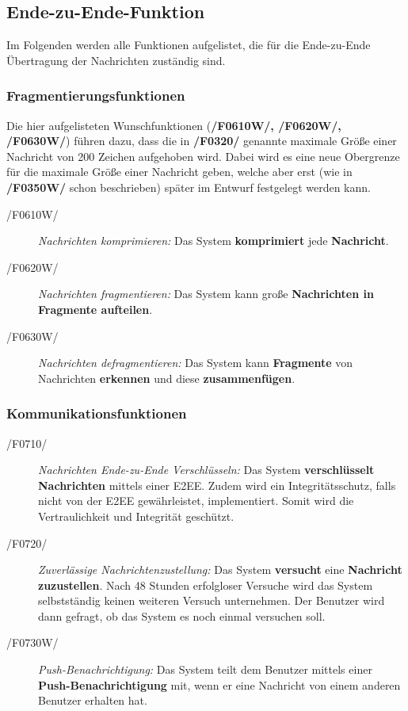 \subsection{Ende-zu-Ende-Funktion}
Im Folgenden werden alle Funktionen aufgelistet, die für die Ende-zu-Ende Übertragung der Nachrichten zuständig sind.
\subsubsection{Fragmentierungsfunktionen}
Die hier aufgelisteten Wunschfunktionen (\textbf{/F0610W/, /F0620W/, /F0630W/}) führen dazu, dass die in \textbf{/F0320/} genannte maximale Größe einer Nachricht von 200 Zeichen aufgehoben wird. 
Dabei wird es eine neue Obergrenze für die maximale Größe einer Nachricht geben, welche aber erst (wie in \textbf{/F0350W/} schon beschrieben) später im Entwurf festgelegt werden kann.
	\begin{description}
		\item[/F0610W/]
			\textit{Nachrichten komprimieren:} 
			Das System \textbf{komprimiert} jede \textbf{Nachricht}.
		\item[/F0620W/]
			\textit{Nachrichten fragmentieren:}
			Das System kann große \textbf{Nachrichten in Fragmente aufteilen}.
		\item[/F0630W/]
			\textit{Nachrichten defragmentieren:}
			Das System kann \textbf{Fragmente}  von Nachrichten \textbf{erkennen} und diese \textbf{zusammenfügen}.
	\end{description}
	
\subsubsection{Kommunikationsfunktionen}
	\begin{description}
		\item[/F0710/]
			\textit{Nachrichten Ende-zu-Ende Verschlüsseln:}
			Das System \textbf{verschlüsselt Nachrichten} mittels einer \ac{E2EE}. Zudem wird ein Integritätsschutz, falls nicht von der \ac{E2EE} gewährleistet, implementiert.
			Somit wird die Vertraulichkeit und Integrität geschützt.
		\item[/F0720/]
			\textit{Zuverlässige Nachrichtenzustellung:}
			Das System \textbf{versucht} eine \textbf{Nachricht zuzustellen}. 
			Nach 48 Stunden erfolgloser Versuche wird das System selbstständig keinen weiteren Versuch unternehmen.
			Der Benutzer wird dann gefragt, ob das System es noch einmal versuchen soll.
		\item[/F0730W/]
			\textit{Push-Benachrichtigung:}
			Das System teilt dem Benutzer mittels einer \textbf{Push-Benachrichtigung} mit, wenn er eine Nachricht von einem anderen Benutzer erhalten hat.

	\end{description}
















